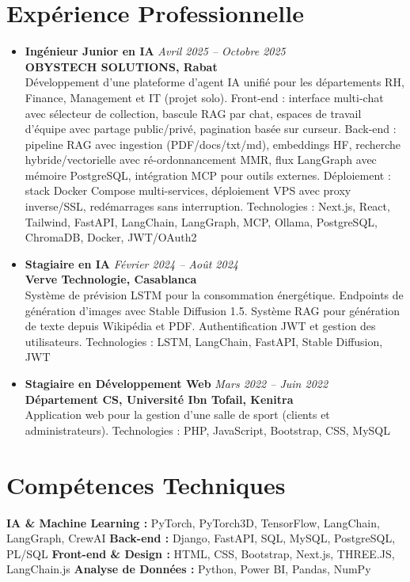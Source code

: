 \documentclass[10pt,a4paper]{article}
\newcommand{\cvitem}[2]{\textbf{#1} \hfill \textit{#2}}
\begin{document}
\section*{Expérience Professionnelle}
\begin{itemize}
    \item \cvitem{Ingénieur Junior en IA}{Avril 2025 -- Octobre 2025}\\
    \textbf{OBYSTECH SOLUTIONS, Rabat}\\
    Développement d'une plateforme d'agent IA unifié pour les départements RH, Finance, Management et IT (projet solo). Front-end : interface multi-chat avec sélecteur de collection, bascule RAG par chat, espaces de travail d'équipe avec partage public/privé, pagination basée sur curseur. Back-end : pipeline RAG avec ingestion (PDF/docs/txt/md), embeddings HF, recherche hybride/vectorielle avec ré-ordonnancement MMR, flux LangGraph avec mémoire PostgreSQL, intégration MCP pour outils externes. Déploiement : stack Docker Compose multi-services, déploiement VPS avec proxy inverse/SSL, redémarrages sans interruption. Technologies : Next.js, React, Tailwind, FastAPI, LangChain, LangGraph, MCP, Ollama, PostgreSQL, ChromaDB, Docker, JWT/OAuth2
    \item \cvitem{Stagiaire en IA}{Février 2024 -- Août 2024}\\
    \textbf{Verve Technologie, Casablanca}\\
    Système de prévision LSTM pour la consommation énergétique. Endpoints de génération d'images avec Stable Diffusion 1.5. Système RAG pour génération de texte depuis Wikipédia et PDF. Authentification JWT et gestion des utilisateurs. Technologies : LSTM, LangChain, FastAPI, Stable Diffusion, JWT
    \item \cvitem{Stagiaire en Développement Web}{Mars 2022 -- Juin 2022}\\
    \textbf{Département CS, Université Ibn Tofail, Kenitra}\\
    Application web pour la gestion d'une salle de sport (clients et administrateurs). Technologies : PHP, JavaScript, Bootstrap, CSS, MySQL
\end{itemize}

\section*{Compétences Techniques}
\textbf{IA \& Machine Learning :} PyTorch, PyTorch3D, TensorFlow, LangChain, LangGraph, CrewAI \quad
\textbf{Back-end :} Django, FastAPI, SQL, MySQL, PostgreSQL, PL/SQL \quad
\textbf{Front-end \& Design :} HTML, CSS, Bootstrap, Next.js, THREE.JS, LangChain.js \quad
\textbf{Analyse de Données :} Python, Power BI, Pandas, NumPy
\end{document}

